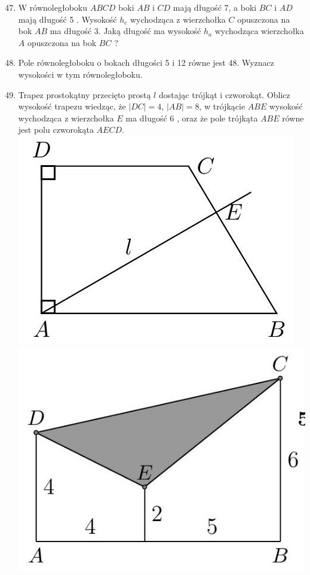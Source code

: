 \documentclass[10pt]{article}
\begin{document}
\begin{enumerate}
  \setcounter{enumi}{46}
  \item W równoległoboku \(A B C D\) boki \(A B\) i \(C D\) mają długość 7, a boki \(B C\) i \(A D\) mają długość 5 . Wysokość \(h_{c}\) wychodząca z wierzchołka \(C\) opuszczona na bok \(A B\) ma długość 3. Jaką długość ma wysokość \(h_{a}\) wychodząca wierzchołka \(A\) opuszczona na bok \(B C\) ?
  \item Pole równoległoboku o bokach długości 5 i 12 równe jest 48. Wyznacz wysokości w tym równoległoboku.
  \item Trapez prostokątny przecięto prostą \(l\) dostając trójkąt i czworokąt. Oblicz wysokość trapezu wiedząc, że \(|D C|=4\), \(|A B|=8\), w trójkącie \(A B E\) wysokość wychodząca z wierzchołka \(E\) ma długość 6 , oraz że pole trójkąta \(A B E\) równe jest polu czworokąta \(A E C D\).\\
\includegraphics[max width=\textwidth, center]{2024_11_21_8f01584889ff06348ae7g-200(1)}\\
\includegraphics[max width=\textwidth, center]{2024_11_21_8f01584889ff06348ae7g-201(3)}

\end{enumerate}
\end{document}
